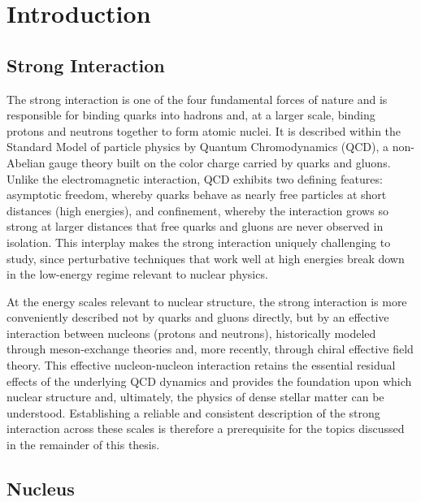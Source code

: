 \chapter{Introduction} 



% 

\section{Strong Interaction}

The strong interaction is one of the four fundamental forces of nature and is responsible for binding quarks into hadrons and, at a larger scale, binding protons and neutrons together to form atomic nuclei. It is described within the Standard Model of particle physics by Quantum Chromodynamics (QCD), a non-Abelian gauge theory built on the color charge carried by quarks and gluons. Unlike the electromagnetic interaction, QCD exhibits two defining features: asymptotic freedom, whereby quarks behave as nearly free particles at short distances (high energies), and confinement, whereby the interaction grows so strong at larger distances that free quarks and gluons are never observed in isolation. This interplay makes the strong interaction uniquely challenging to study, since perturbative techniques that work well at high energies break down in the low-energy regime relevant to nuclear physics.

At the energy scales relevant to nuclear structure, the strong interaction is more conveniently described not by quarks and gluons directly, but by an effective interaction between nucleons (protons and neutrons), historically modeled through meson-exchange theories and, more recently, through chiral effective field theory. This effective nucleon-nucleon interaction retains the essential residual effects of the underlying QCD dynamics and provides the foundation upon which nuclear structure and, ultimately, the physics of dense stellar matter can be understood. Establishing a reliable and consistent description of the strong interaction across these scales is therefore a prerequisite for the topics discussed in the remainder of this thesis.

\section{Nucleus}

